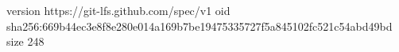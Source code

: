 version https://git-lfs.github.com/spec/v1
oid sha256:669b44ec3e8f8e280e014a169b7be19475335727f5a845102fc521c54abd49bd
size 248
